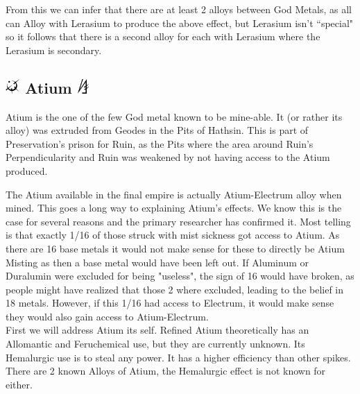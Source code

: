 \documentclass[conference]{IEEEtran}
\begin{document}
From this we can infer that there are at least 2 alloys between God Metals, as all can Alloy with Lerasium to produce the above effect, but Lerasium isn't ``special" so it follows that there is a second alloy for each with Lerasium where the Lerasium is secondary.  

\subsection*{\includegraphics[height=1em]{images/Atium.png}  Atium \cite{SH-PT1-CH2} \includegraphics[height=1em]{images/Atium_(Feruchemy).png}}
Atium is the one of the few God metal known to be mine-able.  It (or rather its alloy\cite{HE-TB}\cite{atium-electrum}) was extruded from Geodes in the Pits of Hathsin.\cite{TFE-CH13}  This is part of Preservation's prison for Ruin,\cite{WoF} as the Pits where the area around Ruin's Perpendicularity\cite{SH-PT2-CH1} and Ruin was weakened by not having access to the Atium produced.\cite{HoA}
 
The Atium available in the final empire\cite{TFE-CH13} is actually Atium-Electrum alloy when mined.\cite{atium-electrum}  This goes a long way to explaining Atium's effects.  We know this is the case for several reasons and the primary researcher has confirmed it.  Most telling is that exactly 1/16 of those struck with mist sickness got access to Atium.\cite{HoA-CH70}  As there are 16 base metals it would not make sense for these to directly be Atium Misting as then a base metal would have been left out.  If Aluminum or Duralumin were excluded for being "useless", the sign of 16 would have broken, as people might have realized that those 2 where excluded, leading to the belief in 18 metals.  However, if this 1/16 had access to Electrum, it would make sense they would also gain access to Atium-Electrum.\\

First we will address Atium its self.  Refined Atium theoretically has an Allomantic and Feruchemical use, but they are currently unknown.  Its Hemalurgic use is to steal any power.\cite{HE-TB}  It has a higher efficiency than other spikes.\cite{atium-efficency}\\

There are 2 known Alloys of Atium, the Hemalurgic effect is not known for either.\\
\end{document}
